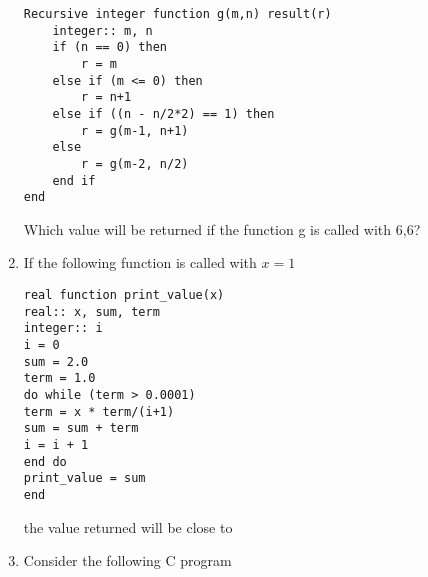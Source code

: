 \documentclass[journal,,12pt,onecolumn]{IEEEtran}
\theoremstyle{remark}
\begin{document}
\begin{enumerate}
\begin{lstlisting}
Recursive integer function g(m,n) result(r)
    integer:: m, n
    if (n == 0) then
        r = m
    else if (m <= 0) then
        r = n+1
    else if ((n - n/2*2) == 1) then
        r = g(m-1, n+1)
    else
        r = g(m-2, n/2)
    end if
end
\end{lstlisting}
Which value will be returned if the function g is called with 6,6?
\begin{enumerate}
\end{enumerate}
\bigskip
\item If the following function is called with $x=1$
\lstset{language=[90]Fortran,
        basicstyle=\ttfamily,  %
        keywordstyle=\ttfamily,  %
        commentstyle=\ttfamily,  %
        numberstyle=\tiny,
        stepnumber=1,
        numbersep=5pt,
        showstringspaces=false,
        tabsize=4,
        breaklines=true,
        frame=none}  %
\begin{lstlisting}
real function print_value(x)
real:: x, sum, term
integer:: i
i = 0
sum = 2.0
term = 1.0
do while (term > 0.0001)
term = x * term/(i+1)
sum = sum + term
i = i + 1
end do
print_value = sum
end
\end{lstlisting}
the value returned will be close to
\begin{enumerate}
\end{enumerate}
\bigskip
\item Consider the following C program
\lstset{language=[90]Fortran,
        basicstyle=\ttfamily,  %
        keywordstyle=\ttfamily,  %
        commentstyle=\ttfamily,  %
}
\end{enumerate}
\end{document}
